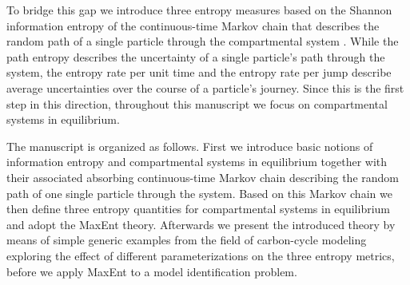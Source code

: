 \documentclass[smallextended]{svjour3}
\begin{document}
To bridge this gap we introduce three entropy measures based on the Shannon information entropy \citep{Shannon1949TUoIP} of the continuous-time Markov chain that describes the random path of a single particle through the compartmental system \citep{Metzler2018MGS}.
While the path entropy describes the uncertainty of a single particle's path through the system, the entropy rate per unit time and the entropy rate per jump describe average uncertainties over the course of a particle's journey.
Since this is the first step in this direction, throughout this manuscript we focus on compartmental systems in equilibrium.

The manuscript is organized as follows.
First we introduce basic notions of information entropy and compartmental systems in equilibrium together with their associated absorbing continuous-time Markov chain describing the random path of one single particle through the system.
Based on this Markov chain we then define three entropy quantities for compartmental systems in equilibrium and adopt the MaxEnt theory.
Afterwards we present the introduced theory by means of simple generic examples from the field of carbon-cycle modeling exploring the effect of different parameterizations on the three entropy metrics, before we apply MaxEnt to a model identification problem.
\end{document}
